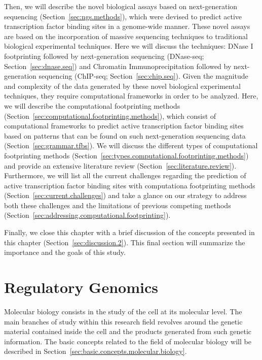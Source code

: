 Then, we will describe the novel biological assays based on next-generation sequencing (Section~\ref{sec:ngs.methods}), which were devised to predict active transcription factor binding sites in a genome-wide manner. These novel assays are based on the incorporation of massive sequencing techniques to traditional biological experimental techniques. Here we will discuss the techniques: DNase I footprinting followed by next-generation sequencing (DNase-seq; Section~\ref{sec:dnase.seq}) and Chromatin Immunoprecipitation followed by next-generation sequencing (ChIP-seq; Section~\ref{sec:chip.seq}). Given the magnitude and complexity of the data generated by these novel biological experimental techniques, they require computational frameworks in order to be analyzed. Here, we will describe the computational footprinting methods (Section~\ref{sec:computational.footprinting.methods}), which consist of computational frameworks to predict active transcription factor binding sites based on patterns that can be found on such next-generation sequencing data (Section~\ref{sec:grammar.tfbs}). We will discuss the different types of computational footprinting methods (Section~\ref{sec:types.computational.footprinting.methods}) and provide an extensive literature review (Section~\ref{sec:literature.review}). Furthermore, we will list all the current challenges regarding the prediction of active transcription factor binding sites with computationa footprinting methods (Section~\ref{sec:current.challenges}) and take a glance on our strategy to address both these challenges and the limitations of previous competing methods (Section~\ref{sec:addressing.computational.footprinting}).

Finally, we close this chapter with a brief discussion of the concepts presented in this chapter (Section~\ref{sec:discussion.2}). This final section will summarize the importance and the goals of this study.

\section{Regulatory Genomics}
\label{sec:regulatory.genomics}

Molecular biology consists in the study of the cell at its molecular level. The main branches of study within this research field revolves around the genetic material contained inside the cell and the products generated from such genetic information. The basic concepts related to the field of molecular biology will be described in Section~\ref{sec:basic.concepts.molecular.biology}.

